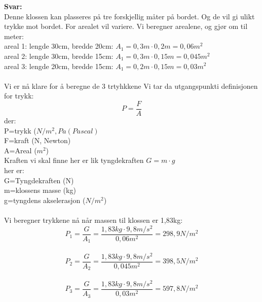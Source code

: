 \documentclass[12pt,a4paper]{article}
\begin{document}
\noindent\textbf{Svar:}\\
Denne klossen kan plasseres på tre forskjellig måter på bordet.  Og de vil gi ulikt trykke mot bordet. For arealet vil variere.  Vi beregner arealene, og gjør om til meter:\\
areal 1: lengde 30cm, bredde 20cm:  $A_1=0,3m\cdot 0,2m=0,06m^2$\\
areal 2: lengde 30cm, bredde 15cm:  $A_1=0,3m\cdot 0,15m=0,045m^2$\\
areal 3: lengde 20cm, bredde 15cm:  $A_1=0,2m\cdot 0,15m=0,03m^2$\\\\
Vi er nå klare for å beregne de 3 trtyhkkene  Vi tar da utgangspunkti definisjonen for trykk:
$$P=\frac{F}{A}$$
der:\\
P=trykk ($N/m^2, Pa (Pascal)$\\
F=kraft (N, Newton)\\
A=Areal ($m^2$)\\

\noindent Kraften vi skal finne her  er lik tyngdekraften $G=m\cdot g$\\  
her er:\\
G=Tyngdekraften (N)\\
m=klossens masse (kg)\\
g=tyngdens akselerasjon ($N/m^2$)\\\\
\noindent Vi beregner trykkene nå når massen til klossen er 1,83kg:\\
$$P_1=\frac{G}{A_1}=\frac{1,83kg\cdot 9,8m/s^2}{0,06m^2}=298,9N/m^2$$\\
$$P_2=\frac{G}{A_2}=\frac{1,83kg\cdot 9,8m/s^2}{0,045m^2}=398,5N/m^2$$\\
$$P_3=\frac{G}{A_3}=\frac{1,83kg\cdot 9,8m/s^2}{0,03m^2}=597,8N/m^2$$
\end{document}
